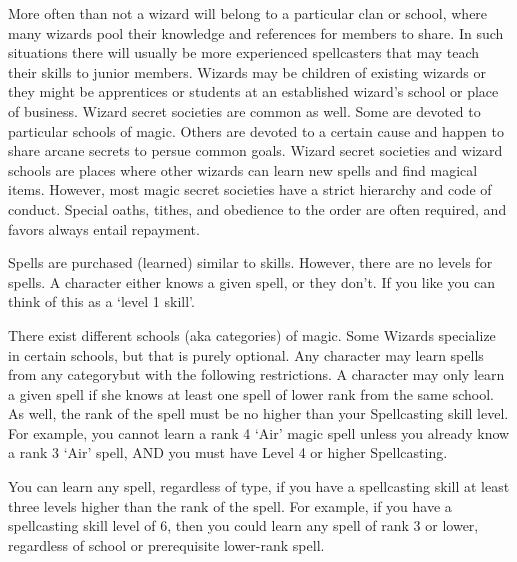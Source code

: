 \documentclass[twoside]{book}
\begin{document}
    {  
      More often than not a wizard will belong to a
               particular clan or school, where many wizards pool their
               knowledge and references for members to share. In such
               situations there will usually be more experienced
               spellcasters that may teach their skills to junior
               members. Wizards may be children of existing wizards or
               they might be apprentices or students at an established
               wizard's school or place of business. Wizard secret
               societies are common as well. Some are devoted to
               particular schools of magic. Others are devoted to a
               certain cause and happen to share arcane secrets to persue
               common goals. Wizard secret societies and wizard schools
               are places where other wizards can learn new spells and
               find magical items. However, most magic secret societies
               have a strict hierarchy and code of conduct. Special
               oaths, tithes, and obedience to the order are often
               required, and favors always entail repayment. 
    }
  
    {  
      Spells are purchased (learned) similar to skills.
               However, there are no levels for spells. A character
               either knows a given spell, or they don't. If you
               like you can think of this as a `level 1
               skill'. 
    }
  
    {  
      There exist different schools (aka categories) of
               magic. Some Wizards specialize in certain schools, but
               that is purely optional. Any character may learn spells
               from any categorybut with the following
               restrictions. A character may only learn a given spell if
               she knows at least one spell of lower rank from the same
               school. As well, the rank of the spell must be no higher
               than your Spellcasting skill level. For example, you
               cannot learn a rank 4 `Air' magic spell unless
               you already know a rank 3 `Air' spell, AND you
               must have Level 4 or higher Spellcasting. 
    }
  
    {  
      You can learn any spell, regardless of type, if you
               have a spellcasting skill at least three levels higher
               than the rank of the spell. For example, if you have a
               spellcasting skill level of 6, then you could learn any
               spell of rank 3 or lower, regardless of school or
               prerequisite lower-rank spell. 
    }
  
\end{document}
